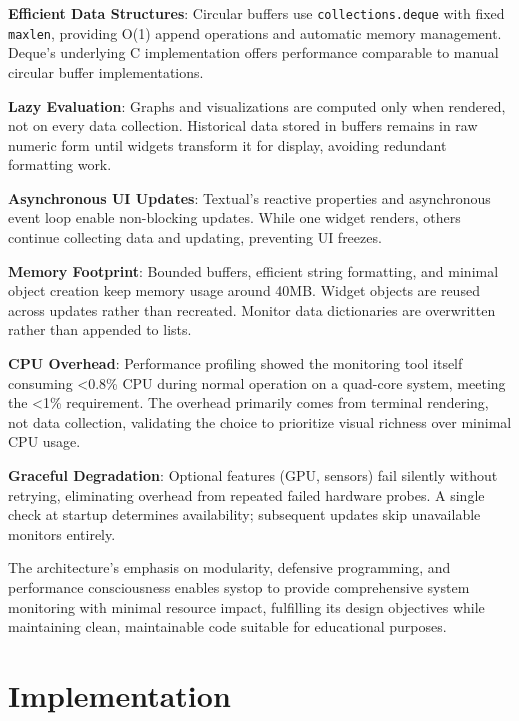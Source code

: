 \documentclass[12pt,a4paper,oneside]{report}
\begin{document}
\textbf{Efficient Data Structures}: Circular buffers use \texttt{collections.deque} with fixed \texttt{maxlen}, providing O(1) append operations and automatic memory management. Deque's underlying C implementation offers performance comparable to manual circular buffer implementations.

\textbf{Lazy Evaluation}: Graphs and visualizations are computed only when rendered, not on every data collection. Historical data stored in buffers remains in raw numeric form until widgets transform it for display, avoiding redundant formatting work.

\textbf{Asynchronous UI Updates}: Textual's reactive properties and asynchronous event loop enable non-blocking updates. While one widget renders, others continue collecting data and updating, preventing UI freezes.

\textbf{Memory Footprint}: Bounded buffers, efficient string formatting, and minimal object creation keep memory usage around 40MB. Widget objects are reused across updates rather than recreated. Monitor data dictionaries are overwritten rather than appended to lists.

\textbf{CPU Overhead}: Performance profiling showed the monitoring tool itself consuming <0.8\% CPU during normal operation on a quad-core system, meeting the <1\% requirement. The overhead primarily comes from terminal rendering, not data collection, validating the choice to prioritize visual richness over minimal CPU usage.

\textbf{Graceful Degradation}: Optional features (GPU, sensors) fail silently without retrying, eliminating overhead from repeated failed hardware probes. A single check at startup determines availability; subsequent updates skip unavailable monitors entirely.

The architecture's emphasis on modularity, defensive programming, and performance consciousness enables systop to provide comprehensive system monitoring with minimal resource impact, fulfilling its design objectives while maintaining clean, maintainable code suitable for educational purposes.

\chapter{Implementation}
\label{chap:implementation}
\end{document}
